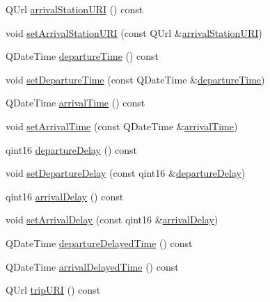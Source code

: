 \begin{DoxyCompactItemize}
Q\+Url \mbox{\hyperlink{classFragments_1_1Fragment_a74d2fae0d687f2389121fb720f8f6505}{arrival\+Station\+U\+RI}} () const
\item 
void \mbox{\hyperlink{classFragments_1_1Fragment_af18c29375ad402d4ec02133fb5534a8e}{set\+Arrival\+Station\+U\+RI}} (const Q\+Url \&\mbox{\hyperlink{classFragments_1_1Fragment_a74d2fae0d687f2389121fb720f8f6505}{arrival\+Station\+U\+RI}})
\item 
Q\+Date\+Time \mbox{\hyperlink{classFragments_1_1Fragment_adfcf2bb9a548f41f4ca88ad117c655a3}{departure\+Time}} () const
\item 
void \mbox{\hyperlink{classFragments_1_1Fragment_a595b2c52c5cbaab0a97ceda63028d91d}{set\+Departure\+Time}} (const Q\+Date\+Time \&\mbox{\hyperlink{classFragments_1_1Fragment_adfcf2bb9a548f41f4ca88ad117c655a3}{departure\+Time}})
\item 
Q\+Date\+Time \mbox{\hyperlink{classFragments_1_1Fragment_aa7e96d4d8b9e36c19d3f6134ff3072e9}{arrival\+Time}} () const
\item 
void \mbox{\hyperlink{classFragments_1_1Fragment_a5b7ed13c7d4417f3b4f3d87aebd68a90}{set\+Arrival\+Time}} (const Q\+Date\+Time \&\mbox{\hyperlink{classFragments_1_1Fragment_aa7e96d4d8b9e36c19d3f6134ff3072e9}{arrival\+Time}})
\item 
qint16 \mbox{\hyperlink{classFragments_1_1Fragment_a8c8363f22d1aca339a66d342f9e5f0c8}{departure\+Delay}} () const
\item 
void \mbox{\hyperlink{classFragments_1_1Fragment_a3293b86baeee32223a5019594fb1ae82}{set\+Departure\+Delay}} (const qint16 \&\mbox{\hyperlink{classFragments_1_1Fragment_a8c8363f22d1aca339a66d342f9e5f0c8}{departure\+Delay}})
\item 
qint16 \mbox{\hyperlink{classFragments_1_1Fragment_aec60f571141b0c7aacbc172e83a4a2d3}{arrival\+Delay}} () const
\item 
void \mbox{\hyperlink{classFragments_1_1Fragment_ae5df59623d6835ec0224d58f9f3903db}{set\+Arrival\+Delay}} (const qint16 \&\mbox{\hyperlink{classFragments_1_1Fragment_aec60f571141b0c7aacbc172e83a4a2d3}{arrival\+Delay}})
\item 
Q\+Date\+Time \mbox{\hyperlink{classFragments_1_1Fragment_a23f4a6f0401e2d2e6aa2f53621beefa0}{departure\+Delayed\+Time}} () const
\item 
Q\+Date\+Time \mbox{\hyperlink{classFragments_1_1Fragment_a9948ab3690d2c290eda2adc89415e2b2}{arrival\+Delayed\+Time}} () const
\item 
Q\+Url \mbox{\hyperlink{classFragments_1_1Fragment_aa3b1beb97e501bfa8ecb2127c2729803}{trip\+U\+RI}} () const

\end{DoxyCompactItemize}
